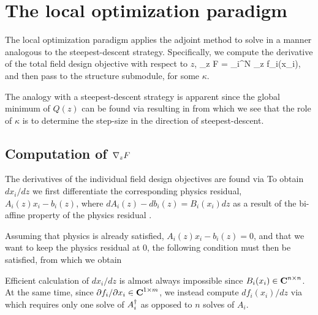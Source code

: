 \section{The local optimization paradigm}
The local optimization paradigm applies the adjoint method to solve 
    in a manner analogous to the steepest-descent strategy.
Specifically, we compute the derivative of the total field design objective with respect to $z$,
        {\grad_z F = \sum_i^N \grad_z f_i(x_i),}
    and then pass 
    to the structure submodule, for some $\kappa$.

The analogy with a steepest-descent strategy is apparent since 
    the global minimum of $Q(z)$ can be found via
    resulting in 
    from which we see that the role of $\kappa$ is to determine the step-size 
    in the direction of steepest-descent.

\subsection{Computation of $\nabla_z F$}
The derivatives of the individual field design objectives are found via
To obtain ${dx_i}/{dz}$ we first differentiate the corresponding physics residual, 
    $A_i(z) x_i - b_i(z)$,
    where $dA_i(z) - db_i(z) = B_i(x_i)dz$ 
    as a result of the bi-affine property of the physics residual .

Assuming that physics is already satisfied, $A_i(z) x_i - b_i(z) = 0$,
    and that we want to keep the physics residual at 0,
    the following condition must then be satisfied,
    from which we obtain

Efficient calculation of $dx_i/dz$ is almost always impossible since $B_i(x_i) \in {\mbox{\bf C}}^{n \times n}$.
At the same time, since ${\partial f_i}/{\partial x_i} \in {\mbox{\bf C}}^{1 \times m}$, we instead compute $df_i(x_i)/dz$ via
    which requires only one solve of $A_i^\dagger$ as opposed to $n$ solves of $A_i$.

